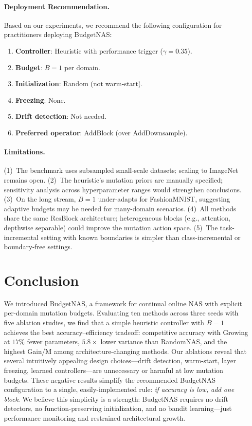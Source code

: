 \documentclass[10pt,twocolumn,letterpaper]{article}
\begin{document}
\paragraph{Deployment Recommendation.}
Based on our experiments, we recommend the following configuration for practitioners deploying BudgetNAS:
\begin{enumerate}
    \item \textbf{Controller}: Heuristic with performance trigger ($\gamma = 0.35$).
    \item \textbf{Budget}: $B = 1$ per domain.
    \item \textbf{Initialization}: Random (not warm-start).
    \item \textbf{Freezing}: None.
    \item \textbf{Drift detection}: Not needed.
    \item \textbf{Preferred operator}: AddBlock (over AddDownsample).
\end{enumerate}

\paragraph{Limitations.}
(1)~The benchmark uses subsampled small-scale datasets; scaling to ImageNet remains open.
(2)~The heuristic's mutation priors are manually specified; sensitivity analysis across hyperparameter ranges would strengthen conclusions.
(3)~On the long stream, $B{=}1$ under-adapts for FashionMNIST, suggesting adaptive budgets may be needed for many-domain scenarios.
(4)~All methods share the same ResBlock architecture; heterogeneous blocks (e.g., attention, depthwise separable) could improve the mutation action space.
(5)~The task-incremental setting with known boundaries is simpler than class-incremental or boundary-free settings.

\section{Conclusion}
\label{sec:conclusion}

We introduced BudgetNAS, a framework for continual online NAS with explicit per-domain mutation budgets. Evaluating ten methods across three seeds with five ablation studies, we find that a simple heuristic controller with $B{=}1$ achieves the best accuracy--efficiency tradeoff: competitive accuracy with Growing at $17\%$ fewer parameters, $5.8\times$ lower variance than RandomNAS, and the highest Gain/M among architecture-changing methods. Our ablations reveal that several intuitively appealing design choices---drift detection, warm-start, layer freezing, learned controllers---are unnecessary or harmful at low mutation budgets. These negative results simplify the recommended BudgetNAS configuration to a single, easily-implemented rule: \emph{if accuracy is low, add one block}. We believe this simplicity is a strength: BudgetNAS requires no drift detectors, no function-preserving initialization, and no bandit learning---just performance monitoring and restrained architectural growth.

{
    \small
    
    
}
\end{document}

